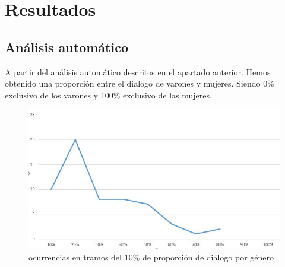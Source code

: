 \noindent %
\chapter{Resultados}
\section{Análisis automático}
    A partir del análisis automático descritos en el apartado anterior. Hemos obtenido una proporción entre el dialogo de varones y mujeres. Siendo 0\% exclusivo de los varones y 100\% exclusivo de las mujeres.
    
    \begin{figure}
        \centering
        \includegraphics[scale=0.7]{Images/distribucion.jpg}
        \caption{ocurrencias en tramos del 10\% de proporción de diálogo por género}
    \end{figure}
    
\newpage
